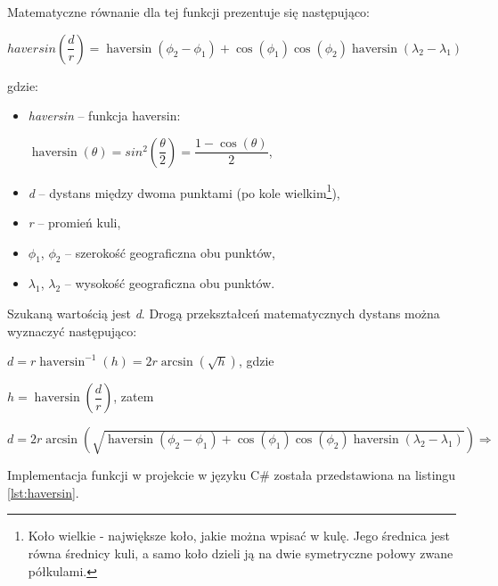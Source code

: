 \documentclass[a4paper]{book}
\DeclareMathOperator{\haversin}{haversin}
\begin{document}
    		Matematyczne równanie dla tej funkcji prezentuje się następująco:
			
			$haversin (\dfrac{d}{r}) = \haversin(\phi_{2} - \phi_{1}) + \cos(\phi_{1})\cos(\phi_{2})\haversin(\lambda_{2} - \lambda_{1})$
			
			gdzie:
			
			\begin{itemize}
				\item \textit{haversin} -- funkcja haversin:
				
				$\haversin(\theta) = sin^{2}(\dfrac{\theta}{2}) = \dfrac{1-\cos(\theta)}{2}$,
				
				\item \textit{d} -- dystans między dwoma punktami (po kole wielkim\footnote{Koło wielkie - największe koło, jakie można wpisać w kulę. Jego średnica jest równa średnicy kuli, a samo koło dzieli ją na dwie symetryczne połowy zwane półkulami.}),
				
				\item \textit{r} -- promień kuli,
				
				\item $\phi_{1}$, $\phi_{2}$ -- szerokość geograficzna obu punktów,
				
				\item $\lambda_{1}$, $\lambda_{2}$ -- wysokość geograficzna obu punktów.
			\end{itemize}
		
		Szukaną wartością jest \textit{d}. Drogą przekształceń matematycznych dystans można wyznaczyć następująco:
		
				$d = r\haversin^{-1}(h) = 2r \arcsin(\sqrt{h})$, gdzie
				
				$h = \haversin(\dfrac{d}{r}) $, zatem
				
				$d = 2r \arcsin(\sqrt{\haversin(\phi_{2} - \phi_{1}) + \cos(\phi_{1})\cos(\phi_{2})\haversin(\lambda_{2} - \lambda_{1})}) \Rightarrow $
				
		
		Implementacja funkcji w projekcie w języku C\# została przedstawiona na listingu \ref{lst:haversin}.
		
\end{document}
